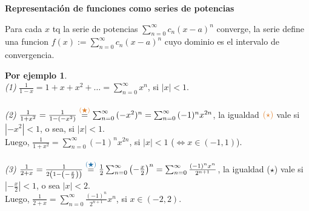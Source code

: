 \documentclass{article}
\theoremstyle{definition}
\theoremstyle{definition}
\newtheorem*{ej}{Por ejemplo}
\theoremstyle{remark}
\begin{document}
\begin{figure}[h]
\centering
\def\svgwidth{0.75\textwidth}

\end{figure}

\pagebreak


\begin{center}
  \textbf{Representación de funciones como series de potencias}
\end{center}
Para cada $x$ tq la serie de potencias $\sum_{n=0}^{\infty}{c_n(x-a)^n}$ converge, la serie define una funcion $f(x):=\sum_{n=0}^{\infty}{c_n(x-a)^n}$ cuyo dominio es el intervalo de convergencia. 

\begin{ej} \; \\ 
  \emph{(1)} \quad $\frac{1}{1-x}=1+x+x^2+\dots =\sum_{n=0}^{\infty}{x^n}$, si $|x|<1$. \\ \\
  \emph{(2)} \quad $\frac{1}{1+x^2}= \frac{1}{1-(-x^2)} \overset{\textcolor{rojop2}{(\bigstar)}}{=}\sum_{n=0}^{\infty}{(-x^2)^n}=\sum_{n=0}^{\infty}{(-1)^nx^{2n}}$, la igualdad $\textcolor{rojop2}{(\star)}$ vale si $|-x^2|<1$, o sea, si $|x|<1$. \\ Luego, $\frac{1}{1+x^2} = \sum_{n=0}^{\infty}{(-1)^nx^{2n}}$, si $|x|<1$ \big($\Leftrightarrow x \in (-1,1)$\big). \\\\
\emph{(3)} \quad $\frac{1}{2+x}=\frac{1}{2\left(1-\left(-\frac{x}{2}\right)\right)} \overset{\textcolor{azulp2}{(\bigstar)}}{=}\frac{1}{2}\sum_{n=0}^{\infty}{\left(-\frac{x}{2}\right)^n}=\sum_{n=0}^{\infty}{\frac{(-1)^nx^n}{2^{n+1}}}$, la igualdad \textcolor{azulp2}{($\star$)} vale si $\left|-\frac{x}{2}\right|<1$, o sea $|x|<2$. \\ Luego, $\frac{1}{2+x}=\sum_{n=0}^{\infty}{\frac{(-1)^n}{2^{n+1}}x^n}$, si $x \in (-2,2)$.
\end{ej}
\end{document}
